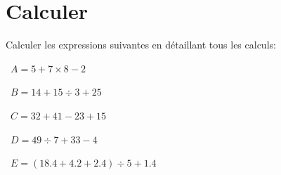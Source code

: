 	
	\section{Calculer}
	Calculer les expressions suivantes en détaillant tous les calculs:
	\begin{questions}
		
	
		\question[4]  $A = 5 + 7 \times 8 - 2$
		
		\fillwithdottedlines{6cm}
			 
		\question[4]  $B = 14 + 15 \div 3 + 25$
		
		\fillwithdottedlines{6cm}
		
			\newpage
		
		\question[4]  $C = 32 + 41 - 23 + 15$
		
		\fillwithdottedlines{6cm}
		
	
		
		\question[4]  $D = 49 \div 7 + 33 - 4$
		
		\fillwithdottedlines{6cm}
		
		\question[4]  $E = (\num{18.4} + \num{4.2} + \num{2.4}) \div 5 + \num{1.4}$
		
		\fillwithdottedlines{6cm}
		
	\end{questions}
	
	

